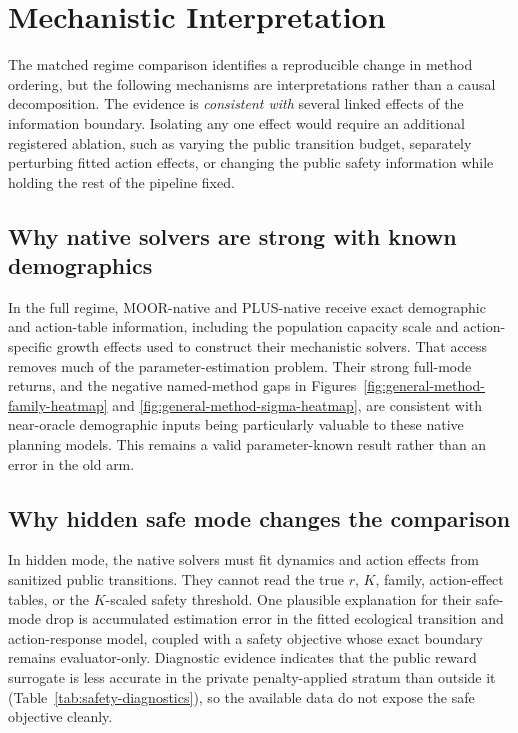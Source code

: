 \documentclass[11pt]{article}
\begin{document}
\clearpage
\section{Mechanistic Interpretation}

The matched regime comparison identifies a reproducible change in method
ordering, but the following mechanisms are interpretations rather than a
causal decomposition.  The evidence is \emph{consistent with} several linked
effects of the information boundary.  Isolating any one effect would require
an additional registered ablation, such as varying the public transition
budget, separately perturbing fitted action effects, or changing the public
safety information while holding the rest of the pipeline fixed.

\subsection{Why native solvers are strong with known demographics}

In the full regime, MOOR-native and PLUS-native receive exact demographic and
action-table information, including the population capacity scale and
action-specific growth effects used to construct their mechanistic solvers.
That access removes much of the parameter-estimation problem.  Their strong
full-mode returns, and the negative named-method gaps in
Figures~\ref{fig:general-method-family-heatmap} and
\ref{fig:general-method-sigma-heatmap}, are consistent with near-oracle
demographic inputs being particularly valuable to these native planning
models.  This remains a valid parameter-known result rather than an error in
the old arm.

\subsection{Why hidden safe mode changes the comparison}

In hidden mode, the native solvers must fit dynamics and action effects from
sanitized public transitions.  They cannot read the true $r$, $K$, family,
action-effect tables, or the $K$-scaled safety threshold.  One plausible
explanation for their safe-mode drop is accumulated estimation error in the
fitted ecological transition and action-response model, coupled with a safety
objective whose exact boundary remains evaluator-only.  Diagnostic evidence
indicates that the public reward surrogate is less accurate in the private
penalty-applied stratum than outside it (Table~\ref{tab:safety-diagnostics}),
so the available data do not expose the safe objective cleanly.
\end{document}
